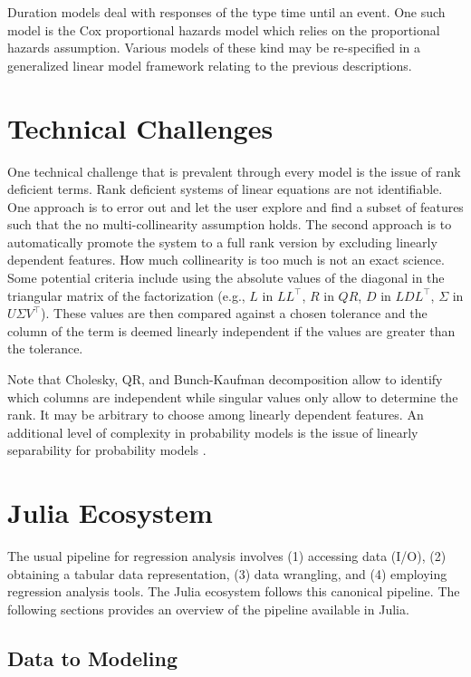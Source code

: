\documentclass{juliacon}
\begin{document}
Duration models deal with responses of the type time until an event. One such model is the Cox proportional hazards model which relies on the proportional hazards assumption. Various models of these kind may be re-specified in a generalized linear model framework relating to the previous descriptions.

\section{Technical Challenges}

One technical challenge that is prevalent through every model is the issue of rank deficient terms. Rank deficient systems of linear equations are not identifiable. One approach is to error out and let the user explore and find a subset of features such that the no multi-collinearity assumption holds. The second approach is to automatically promote the system to a full rank version by excluding linearly dependent features. How much collinearity is too much is not an exact science. Some potential criteria include using the absolute values of the diagonal in the triangular matrix of the factorization (e.g., $L$ in $LL^{\top}$, $R$ in $QR$, $D$ in $LDL^{\top}$, $\Sigma$ in $U\Sigma V^{\top}$). These values are then compared against a chosen tolerance and the column of the term is deemed linearly independent if the values are greater than the tolerance.

Note that Cholesky, QR, and Bunch-Kaufman decomposition allow to identify which columns are independent while singular values only allow to determine the rank. It may be arbitrary to choose among linearly dependent features. An additional level of complexity in probability models is the issue of linearly separability for probability models \cite{Konis_2007}.

\section{Julia Ecosystem}

The usual pipeline for regression analysis involves (1) accessing data (I/O), (2) obtaining a tabular data representation, (3) data wrangling, and (4) employing regression analysis tools. The Julia ecosystem follows this canonical pipeline. The following sections provides an overview of the pipeline available in Julia.

\subsection{Data to Modeling}
\end{document}
